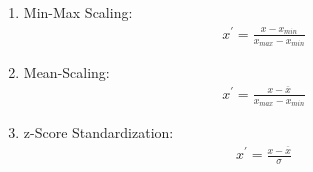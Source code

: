 \begin{enumerate}
    \item Min-Max Scaling:
    \begin{gather}
        x^{\prime} = \frac{x - x_{min}}{x_{max} - x_{min}}
        \label{sec:methods:min-max-normalizationn}
    \end{gather}
    
    \item Mean-Scaling:
    \begin{gather}
        x^{\prime} = \frac{x - \overline{x}}{x_{max} - x_{min}}
        \label{sec:methods:mean-scaling}
    \end{gather}
    
    \item z-Score Standardization:
    \begin{gather}
        x^{\prime} = \frac{x - \overline{x}}{\sigma}
        \label{sec:methods:z-score}
    \end{gather}

\end{enumerate}
